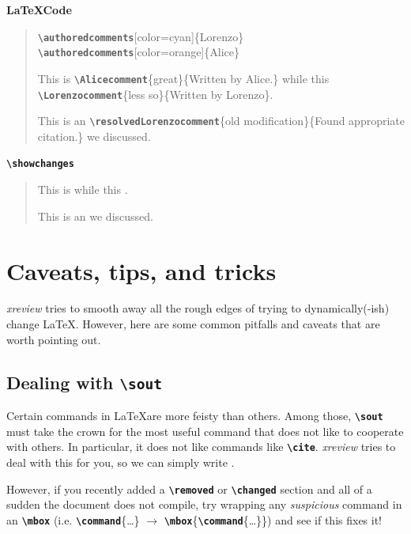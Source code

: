 \documentclass[a4paper]{ltxdoc}
\newcommand{\writecommand}[1]{\texttt{\textbf{{\textbackslash#1}}}}
\newcommand{\writearg}[1]{\{#1\}}
\begin{document}
\textbf{\LaTeX Code}

\begin{quote}
    \writecommand{authoredcomments}[color=cyan]\writearg{Lorenzo}\newline
    \writecommand{authoredcomments}[color=orange]\writearg{Alice}\newline

    This is \writecommand{Alicecomment}\writearg{great}\writearg{Written by Alice.} while this \writecommand{Lorenzocomment}\writearg{less so}\writearg{Written by Lorenzo}.

    This is an \writecommand{resolvedLorenzocomment}\writearg{old modification}\writearg{Found appropriate citation.} we discussed.
\end{quote}

\writecommand{showchanges}
\showchanges

\begin{quote}
This is  while this .

This is an  we discussed.
\end{quote}

\section{Caveats, tips, and tricks}

\textit{xreview} tries to smooth away all the rough edges of trying to dynamically(-ish) change \LaTeX. However, here are some common pitfalls and caveats that are worth pointing out.

\subsection{Dealing with \writecommand{sout}}

Certain commands in \LaTeX are more feisty than others. Among those, \writecommand{sout} must take the crown for the most useful command that does not like to cooperate with others. In particular, it does not like commands like \writecommand{cite}.
\textit{xreview} tries to deal with this for you, so we can simply write .

However, if you recently added a \writecommand{removed} or \writecommand{changed} section and all of a sudden the document does not compile, try wrapping any \textit{suspicious} command in an \writecommand{mbox} (i.e. \writecommand{command}\writearg{\dots} $\rightarrow$ \writecommand{mbox}\{\writecommand{command}\writearg{\dots}\}) and see if this fixes it!
\end{document}
